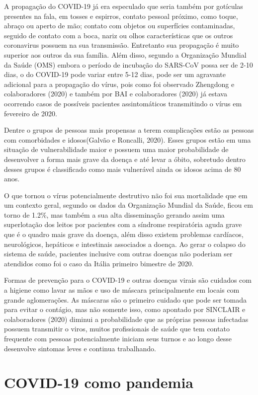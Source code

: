 A propagação do COVID-19 já era especulado que seria também por gotículas presentes na fala, em tosses e espirros, contato pessoal próximo, como toque, abraço ou aperto de mão; contato com objetos ou superfícies contaminadas, seguido de contato com a boca, nariz ou olhos características que os outros coronavirus possuem na sua transmissão. Entretanto sua propagação é muito superior aos outros da sua família. Além disso, segundo a Organização Mundial da Saúde (OMS) embora o período de incubação do SARS-CoV possa ser de 2-10 dias, o do COVID-19 pode variar entre 5-12 dias, pode ser um agravante adicional para a propagação do vírus, pois como foi observado Zhengdong e colaboradores (2020) e também por BAI e colaboradores (2020) já estava ocorrendo casos de possíveis pacientes assintomáticos transmitindo o vírus em fevereiro de 2020.

Dentre o grupos de pessoas mais propensas a terem complicações estão as pessoas com comorbidades e idosos(Galvão e Roncalli, 2020). Esses grupos estão em uma situação de vulnerabilidade maior e possuem uma maior probabilidade de desenvolver a forma mais grave da doença e até levar a óbito, sobretudo dentro desses grupos é classificado como mais vulnerável ainda os idosos acima de 80 anos.

O que tornou o vírus potencialmente destrutivo não foi sua mortalidade que em um contexto geral, segundo os dados da Organização Mundial da Saúde, ficou em torno de 1.2\%, mas também a sua alta disseminação gerando assim uma superlotação dos leitos por pacientes com a síndrome respiratória aguda grave que é o quadro mais grave da doença, além disso existem problemas cardíacos, neurológicos, hepáticos e intestinais associados a doença. Ao gerar o colapso do sistema de saúde, pacientes inclusive com outras doenças não poderiam ser atendidos como foi o caso da Itália primeiro bimestre de 2020.

Formas de prevenção para o COVID-19 e outras doenças virais são cuidados com a higiene como lavar as mãos e uso de máscara principalmente em locais com grande aglomerações. As máscaras são o primeiro cuidado que pode ser tomada para evitar o contágio, mas não somente isso, como apontado por SINCLAIR e colaboradores (2020) diminui a probabilidade que as próprias pessoas infectadas possuem transmitir o viros, muitos profissionais de saúde que tem contato frequente com pessoas potencialmente iniciam seus turnos e ao longo desse desenvolve sintomas leves e continua trabalhando.    

\section{COVID-19 como pandemia}

